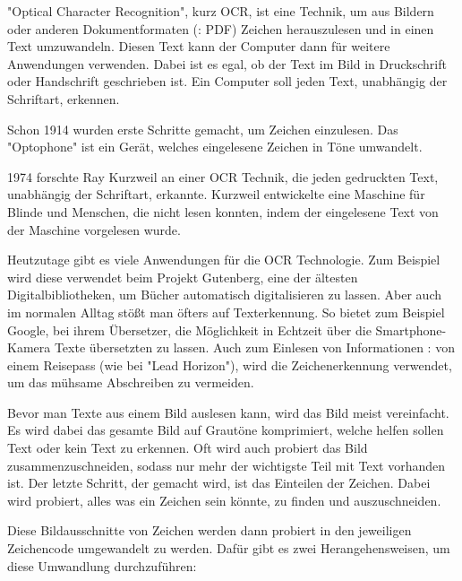 \label{sec:ocr}


"Optical Character Recognition", kurz OCR, ist eine Technik, um aus Bildern oder anderen Dokumentformaten (\zb: PDF) Zeichen herauszulesen und in einen Text umzuwandeln. Diesen Text kann der Computer dann für weitere Anwendungen verwenden. Dabei ist es egal, ob der Text im Bild in Druckschrift oder Handschrift geschrieben ist. Ein Computer soll jeden Text, unabhängig der Schriftart, erkennen.
\cite{OCRIntro}


Schon 1914 wurden erste Schritte gemacht, um Zeichen einzulesen. Das "Optophone" ist ein Gerät, welches eingelesene Zeichen in Töne umwandelt. \cite{OCRRecognition}

1974 forschte Ray Kurzweil an einer OCR Technik, die jeden gedruckten Text, unabhängig der Schriftart, erkannte. Kurzweil entwickelte eine Maschine für Blinde und Menschen, die nicht lesen konnten, indem der eingelesene Text von der Maschine vorgelesen wurde. \cite{OCRRecognition}

Heutzutage gibt es viele Anwendungen für die OCR Technologie. Zum Beispiel wird diese verwendet beim Projekt Gutenberg, eine der ältesten Digitalbibliotheken, um Bücher automatisch digitalisieren zu lassen. Aber auch im normalen Alltag stößt man öfters auf Texterkennung. So bietet zum Beispiel Google, bei ihrem Übersetzer, die Möglichkeit in Echtzeit über die Smartphone-Kamera Texte übersetzten zu lassen. Auch zum Einlesen von Informationen \zb: von einem Reisepass (wie bei "Lead Horizon"), wird die Zeichenerkennung verwendet, um das mühsame Abschreiben zu vermeiden.


Bevor man Texte aus einem Bild auslesen kann, wird das Bild meist vereinfacht. Es wird dabei das gesamte Bild auf Grautöne komprimiert, welche helfen sollen Text oder kein Text zu erkennen. Oft wird auch probiert das Bild zusammenzuschneiden, sodass nur mehr der wichtigste Teil mit Text vorhanden ist. Der letzte Schritt, der gemacht wird, ist das Einteilen der Zeichen. Dabei wird probiert, alles was ein Zeichen sein könnte, zu finden und auszuschneiden. \cite{OCRPreProcessing}

Diese Bildausschnitte von Zeichen werden dann probiert in den jeweiligen Zeichencode umgewandelt zu werden. Dafür gibt es zwei Herangehensweisen, um diese Umwandlung durchzuführen:

